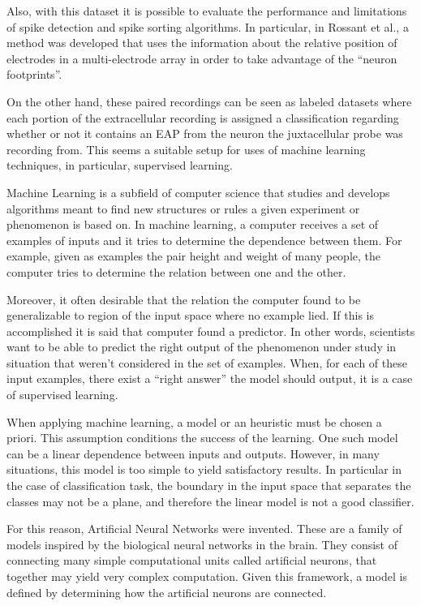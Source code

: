 \documentclass{article}
\begin{document}
Also, with this dataset it is possible to evaluate the performance and limitations of spike detection and spike sorting algorithms. In particular, in Rossant et al., a method was developed that uses the information about the relative position of electrodes in a multi-electrode array in order to take advantage of the “neuron footprints”.

On the other hand, these paired recordings can be seen as labeled datasets where each portion of the extracellular recording is assigned a classification regarding whether or not it contains an EAP from the neuron the juxtacellular probe was recording from. This seems a suitable setup for uses of machine learning techniques, in particular, supervised learning.

Machine Learning is a subfield of computer science that studies and develops algorithms meant to find new structures or rules a given experiment or phenomenon is based on. In machine learning, a computer receives a set of examples of inputs and it tries to determine the dependence between them. For example, given as examples the pair height and weight of many people, the computer tries to determine the relation between one and the other. 
 
Moreover, it often desirable that the relation the computer found to be generalizable to region of the input space where no example lied. If this is accomplished it is said that computer found a predictor. In other words, scientists want to be able to predict the right output of the phenomenon under study in situation that weren't considered in the set of examples. 
When, for each of these input examples, there exist a “right answer” the model should output, it is a case of supervised learning.

When applying machine learning, a model or an heuristic must be chosen a priori. This assumption conditions the success of the learning. One such model can be a linear dependence between inputs and outputs. However, in many situations, this model is too simple to yield satisfactory results. In particular in the case of classification task, the boundary in the input space that separates the  classes may not be a plane, and therefore the linear model is not a good classifier.

For this reason, Artificial Neural Networks were invented. These are a family of models inspired by the biological neural networks in the brain. They consist of connecting many simple computational units called artificial neurons, that together may yield very complex computation. Given this framework, a model is defined by determining how the artificial neurons are connected. 
\end{document}
